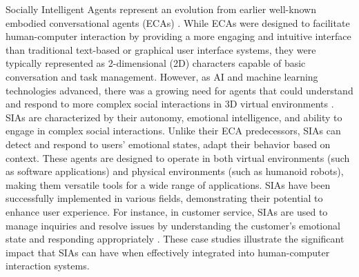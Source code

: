 \documentclass[12pt]{article}
\begin{document}

{Socially Intelligent Agents} represent an evolution from earlier well-known embodied conversational agents (ECAs) \cite{cassell2000embodied}.  While ECAs were designed to facilitate human-computer interaction by providing a more engaging and intuitive interface than traditional text-based or graphical user interface  systems, they were typically represented as 2-dimensional (2D)  characters capable of basic conversation and task management. However, as AI and machine learning technologies advanced, there was a growing need for agents that could understand and respond to more complex social interactions in 3D virtual environments \cite{SIAHandbook2021} .
SIAs are characterized by their autonomy, emotional intelligence, and ability to engage in complex social interactions. Unlike their ECA predecessors, SIAs can detect and respond to users' emotional states, adapt their behavior based on context. These agents are designed to operate in both virtual environments (such as software applications) and physical environments (such as humanoid robots), making them versatile tools for a wide range of applications.
SIAs have been successfully implemented in various fields, demonstrating their potential to enhance user experience. For instance, in customer service, SIAs are used to manage inquiries and resolve issues by understanding the customer's emotional state and responding appropriately \cite{SIAHandbook2021}.  These case studies illustrate the significant impact that SIAs can have when effectively integrated into human-computer interaction systems.


\end{document}
